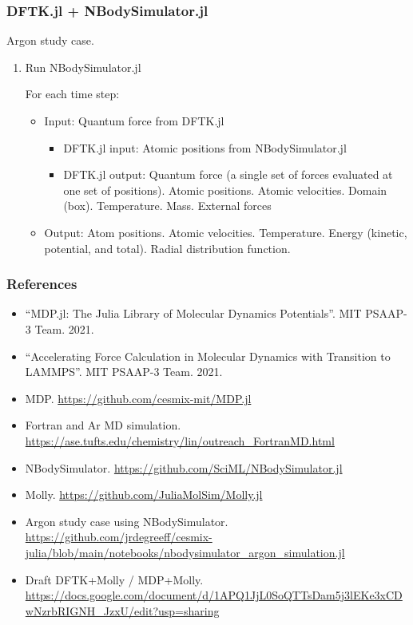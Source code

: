 \documentclass[10pt]{beamer}
\theoremstyle{remark}
\theoremstyle{definition}
\begin{document}
\begin{frame}
\frametitle{DFTK.jl + NBodySimulator.jl}
\small
Argon study case.

\begin{enumerate}
    \item Run NBodySimulator.jl
    
	    For each time step:
		\begin{itemize}
    	\item Input: Quantum force from DFTK.jl
	    		\begin{itemize}
    			\item DFTK.jl input: Atomic positions from NBodySimulator.jl
				\item DFTK.jl output: Quantum force (a single set of forces evaluated at one set of positions). Atomic positions. Atomic velocities. Domain (box). Temperature. Mass. External forces
				\end{itemize}
		\item Output: Atom positions. Atomic velocities. Temperature. Energy (kinetic, potential, and total). Radial distribution function.
		\end{itemize}
      
\end{enumerate}
\end{frame}




\begin{frame}
\frametitle{References}
\small
\begin{itemize}
    \item ``MDP.jl: The Julia Library of Molecular
Dynamics Potentials''. MIT PSAAP-3 Team. 2021.    
    \item ``Accelerating Force Calculation in Molecular
Dynamics with Transition to LAMMPS''. MIT PSAAP-3 Team. 2021.  
    \item MDP. \url{https://github.com/cesmix-mit/MDP.jl}
    \item Fortran and Ar MD simulation. \url{https://ase.tufts.edu/chemistry/lin/outreach_FortranMD.html}
    \item NBodySimulator. \url{https://github.com/SciML/NBodySimulator.jl}
    \item Molly. \url{https://github.com/JuliaMolSim/Molly.jl}    
    \item Argon study case using NBodySimulator. \url{https://github.com/jrdegreeff/cesmix-julia/blob/main/notebooks/nbodysimulator_argon_simulation.jl}
    \item Draft DFTK+Molly / MDP+Molly. \url{https://docs.google.com/document/d/1APQ1JjL0SoQTTsDam5j3lEKe3xCDwNzrbRIGNH_JzxU/edit?usp=sharing}
\end{itemize}

\end{frame}
\end{document}
